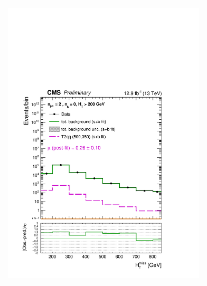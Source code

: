 \begin{figure}[tbhp]
\begin{center}
  \includegraphics[width=0.45\textwidth]{mhtShape_eq0b_le2j_200_Inf_fit_s_aux}
  \end{center}
\end{figure}
